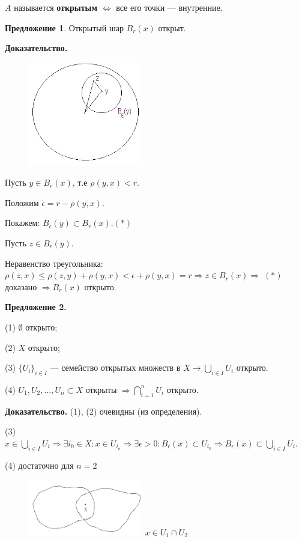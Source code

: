 \documentclass[12pt,a4paper]{article}
\begin{document}
$A$ называется \textbf{открытым} $\Leftrightarrow$ все его точки --- внутренние.

\textbf{Предложение 1}. Открытый шар $B_r(x)$ открыт.

\textbf{Доказательство.}

\begin{figure}
	\includegraphics[width = 5cm]{lect2_2.png}
\end{figure}

Пусть $y \in B_r(x)$, т.е $\rho(y,x) < r.$

Положим $\epsilon = r - \rho(y,x).$

Покажем: $B_{\epsilon}(y) \subset B_r(x). (*)$

Пусть $z \in B_{\epsilon}(y).$

Неравенство треугольника: $\rho(z, x) \leqslant \rho(z, y) + \rho(y, x)< \epsilon + \rho(y, x) = r \Rightarrow z \in B_r(x) \Rightarrow \; (*)$ доказано $\Rightarrow B_r(x)$ открыто. 

\textbf{Предложение 2.}

(1) $\emptyset$ открыто;

(2) $X$ открыто;

(3) $\{U_i\}_{i \in I}$ --- семейство открытых множеств в $X \rightarrow \bigcup_{i \in I} U_i$ открыто.

(4) $U_1, U_2, \ldots, U_n \subset X$ открыты $\Rightarrow \bigcap^{n}_{i = 1} U_i$ открыто.

\textbf{Доказательство.} (1), (2) очевидны (из определения).

(3) $x \in \bigcup_{i \in I} U_i \Rightarrow \exists i_0 \in X: x \in U_{i_o} \Rightarrow \exists \epsilon > 0: B_{\epsilon}(x) \subset U_{i_0} \Rightarrow B_{\epsilon}(x) \subset \bigcup_{i \in I} U_i.$

(4) достаточно для $n = 2$

\begin{figure}
	\includegraphics[width = 5cm]{lect2_3.png}
	$x \in U_1 \cap U_2$
\end{figure}
\end{document}
